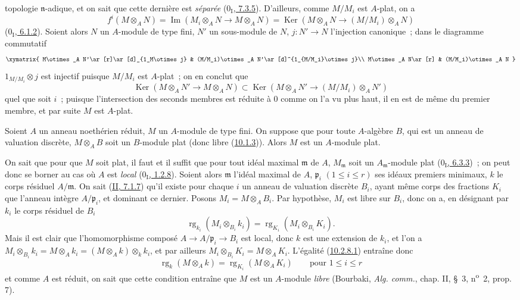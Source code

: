 topologie $\mathfrak n$-adique, et on sait que cette dernière est \emph{séparée}
(\hyperref[0.7.3.5-fr]{$0_{\mathrm I}$, 7.3.5}). D'ailleurs, comme $M/M_i$ est
$A$-plat, on a
\[
  f^i(M\otimes_A N)=\operatorname{Im}(M_i\otimes_A N\to M\otimes_A N)
  =\operatorname{Ker}(M\otimes_A N\to(M/M_i)\otimes_A N)
\]
(\hyperref[0.6.1.2-fr]{$0_{\mathrm I}$, 6.1.2}). Soient alors $N$ un
$A$-module de type fini, $N'$ un sous-module de $N$, $j:N'\to N$ l'injection
canonique~; dans le diagramme commutatif
\[
\xymatrix{
  M\otimes_A N'\ar[r]\ar[d]_{1_M\otimes j} &
  (M/M_i)\otimes_A N'\ar[d]^{1_{M/M_i}\otimes j}\\
  M\otimes_A N\ar[r] & (M/M_i)\otimes_A N
}
\]
$1_{M/M_i}\otimes j$ est injectif puisque $M/M_i$ est $A$-plat~; on en
conclut que
\[
  \operatorname{Ker}(M\otimes_A N'\to M\otimes_A N)
  \subset\operatorname{Ker}(M\otimes_A N'\to(M/M_i)\otimes_A N')
\]
quel que soit $i$~; puisque l'intersection des seconds membres est réduite à
$0$ comme on l'a vu plus haut, il en est de même du premier membre, et par
suite $M$ est $A$-plat.

\begin{proposition}[10.2.8]
\label{0.10.2.8-fr}
Soient $A$ un anneau noethérien réduit, $M$ un $A$-module de type fini. On
suppose que pour toute $A$-algèbre $B$, qui est un anneau de valuation
discrète, $M\otimes_A B$ soit un $B$-module plat (donc libre
(\hyperref[0.10.1.3-fr]{10.1.3})). Alors $M$ est un $A$-module plat.
\end{proposition}

On sait que pour que $M$ soit plat, il faut et il suffit que pour tout idéal
maximal $\mathfrak m$ de $A$, $M_{\mathfrak m}$ soit un
$A_{\mathfrak m}$-module plat
(\hyperref[0.6.3.3-fr]{$0_{\mathrm I}$, 6.3.3})~; on peut donc se borner au cas
où $A$ est \emph{local} (\hyperref[0.1.2.8-fr]{$0_{\mathrm I}$, 1.2.8}).
Soient alors $\mathfrak m$ l'idéal maximal de $A$, $\mathfrak p_i$
$(1\leq i\leq r)$ ses idéaux premiers minimaux, $k$ le corps résiduel
$A/\mathfrak m$. On sait (\hyperref[II.7.1.7-fr]{II, 7.1.7}) qu'il existe
pour chaque $i$ un anneau de valuation discrète $B_i$, ayant même corps des
fractions $K_i$ que l'anneau intègre $A/\mathfrak p_i$, et dominant ce
dernier. Posons $M_i=M\otimes_A B_i$. Par hypothèse, $M_i$ est libre sur
$B_i$, donc on a, en désignant par $k_i$ le corps résiduel de $B_i$
\[
\label{0.10.2.8.1-fr}
  \operatorname{rg}_{k_i}(M_i\otimes_{B_i}k_i)
  =\operatorname{rg}_{K_i}(M_i\otimes_{B_i}K_i).
  \tag{10.2.8.1}
\]
Mais il est clair que l'homomorphisme composé
$A\to A/\mathfrak p_i\to B_i$ est local, donc $k$ est une extension de $k_i$,
et l'on a
$M_i\otimes_{B_i}k_i=M\otimes_A k_i=(M\otimes_A k)\otimes_k k_i$, et par
ailleurs $M_i\otimes_{B_i}K_i=M\otimes_A K_i$. L'égalité
(\hyperref[0.10.2.8.1-fr]{10.2.8.1}) entraîne donc
\[
  \operatorname{rg}_k(M\otimes_A k)=\operatorname{rg}_{K_i}(M\otimes_A K_i)
  \qquad\text{pour }1\leq i\leq r
\]
et comme $A$ est réduit, on sait que cette condition entraîne que $M$ est un
$A$-module \emph{libre} (Bourbaki, \emph{Alg. comm.}, chap. II, \S~3,
n\textsuperscript{o}~2, prop. 7).

